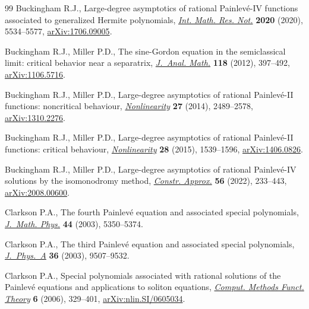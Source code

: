\documentclass[pdftex]{sigma}
\numberwithin{equation}{section}
\theoremstyle{definition}
\begin{document}
\begin{thebibliography}{99}
Buckingham R.J., Large-degree asymptotics of rational {P}ainlev\'e-{IV}
 functions associated to generalized {H}ermite polynomials,
 \href{https://doi.org/10.1093/imrn/rny172}{\textit{Int. Math. Res. Not.}}
 \textbf{2020} (2020), 5534--5577,
 \href{http://arxiv.org/abs/1706.09005}{arXiv:1706.09005}.

Buckingham R.J., Miller P.D., The sine-{G}ordon equation in the semiclassical
 limit: critical behavior near a separatrix,
 \href{https://doi.org/10.1007/s11854-012-0041-3}{\textit{J.~Anal. Math.}}
 \textbf{118} (2012), 397--492,
 \href{http://arxiv.org/abs/1106.5716}{arXiv:1106.5716}.

Buckingham R.J., Miller P.D., Large-degree asymptotics of rational
 {P}ainlev\'e-{II} functions: noncritical behaviour,
 \href{https://doi.org/10.1088/0951-7715/27/10/2489}{\textit{Nonlinearity}}
 \textbf{27} (2014), 2489--2578,
 \href{http://arxiv.org/abs/1310.2276}{arXiv:1310.2276}.

Buckingham R.J., Miller P.D., Large-degree asymptotics of rational
 {P}ainlev\'e-{II} functions: critical behaviour,
 \href{https://doi.org/10.1088/0951-7715/28/6/1539}{\textit{Nonlinearity}}
 \textbf{28} (2015), 1539--1596,
 \href{http://arxiv.org/abs/1406.0826}{arXiv:1406.0826}.

Buckingham R.J., Miller P.D., Large-degree asymptotics of rational
 {P}ainlev\'e-{IV} solutions by the isomonodromy method,
 \href{https://doi.org/10.1007/s00365-022-09586-1}{\textit{Constr. Approx.}}
 \textbf{56} (2022), 233--443,
 \href{http://arxiv.org/abs/2008.00600}{arXiv:2008.00600}.

Clarkson P.A., The fourth {P}ainlev\'e equation and associated special
 polynomials, \href{https://doi.org/10.1063/1.1603958}{\textit{J.~Math.
 Phys.}} \textbf{44} (2003), 5350--5374.

Clarkson P.A., The third {P}ainlev\'e equation and associated special
 polynomials,
 \href{https://doi.org/10.1088/0305-4470/36/36/306}{\textit{J.~Phys.~A}}
 \textbf{36} (2003), 9507--9532.

Clarkson P.A., Special polynomials associated with rational solutions of the
 {P}ainlev\'e equations and applications to soliton equations,
 \href{https://doi.org/10.1007/BF03321618}{\textit{Comput. Methods Funct.
 Theory}} \textbf{6} (2006), 329--401,
 \href{http://arxiv.org/abs/nlin.SI/0605034}{arXiv:nlin.SI/0605034}.


\end{thebibliography}
\end{document}
